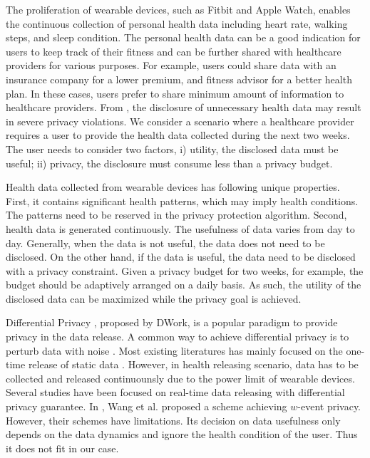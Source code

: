 \documentclass[10pt,conference]{IEEEtran}
\begin{document}
The proliferation of wearable devices, such as Fitbit and Apple Watch, enables the continuous collection of personal health data including heart rate, walking steps, and sleep condition. The personal health data can be a good indication for users to keep track of their ﬁtness and can be further shared with healthcare providers for various purposes. For example, users could share data with an insurance company for a lower premium, and ﬁtness advisor for a better health plan. In these cases, users prefer to share minimum amount of information to healthcare providers. From \cite{Lane2010Balancing}, the disclosure of unnecessary health data may result in severe privacy violations. We consider a scenario where a healthcare provider requires a user to provide the health data collected during the next two weeks. The user needs to consider two factors, i) utility, the disclosed data must be useful; ii) privacy, the disclosure must consume less than a privacy budget.

Health data collected from wearable devices has following unique properties. First, it contains signiﬁcant health patterns, which may imply health conditions. The patterns need to be reserved in the privacy protection algorithm. Second, health data is generated continuously. The usefulness of data varies from day to day. Generally, when the data is not useful, the data does not need to be disclosed. On the other hand, if the data is useful, the data need to be disclosed with a privacy constraint. Given a privacy budget for two weeks, for example, the budget should be adaptively arranged on a daily basis. As such, the utility of the disclosed data can be maximized while the privacy goal is achieved.

Differential Privacy \cite{Dwork2006Differential}, proposed by DWork, is a popular paradigm to provide privacy in the data release. A common way to achieve differential privacy is to perturb data with noise \cite{Dwork2008Differential,Dwork2004Privacy}. Most existing literatures has mainly focused on the one-time release of static data \cite{Dwork2006Calibrating,duan2017distributed,Xiao2011iReduct,Xu2013Differentially,Kellaris2013Practical}. However, in health releasing scenario, data has to be collected and released continuounsly due to the power limit of wearable devices. Several studies\cite{kellaris2014differentially,fan2014adaptive,Li2015Differentially,he2016full} have been focused on real-time data releasing with differential privacy guarantee.  In \cite{Wang2016RescueDP}, Wang et al. proposed a scheme achieving $w$-event privacy. However, their schemes have limitations. Its decision on data usefulness only depends on the data dynamics and ignore the health condition of the user. Thus it does not fit in our case.
\end{document}
